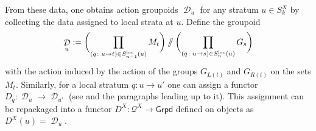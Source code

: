 \documentclass[pdftex]{sigma}
\DeclareMathOperator{\cald}{\mathcal{D}}
\newcommand{\sslash}{\mathbin{/\mkern-6mu/}}
\numberwithin{equation}{section}
\theoremstyle{definition}
\begin{document}
From these data, one obtains action groupoids $\cald_u$ for any stratum $u \in S_k^X$ by collecting the data assigned to local strata at $u$. Define the groupoid
\begin{align*}
 \cald_u := \biggl(\prod_{(q\colon u \rightarrow t) \in S_{n-1}^{\mathrm{loc}}(u)} M_t \biggr) \sslash \biggl( \prod_{(q\colon u \rightarrow s) \in S_n^{\mathrm{loc}}(u)} G_s \biggr)
\end{align*}
with the action induced by the action of the groups $G_{L(t)}$ and $G_{R(t)}$ on the sets $M_t$. Similarly, for a local stratum $q\colon u \rightarrow u'$ one can assign a functor $D_q\colon \cald_u \rightarrow \cald_{u'}$ (see \cite[Lemma 4.3]{FMM} and the paragraphs leading up to it). This assignment can be repackaged into a functor $D^X\colon \mathcal{Q}^X \rightarrow \mathsf{Grpd}$ defined on objects as $D^X(u) = \cald_u$.
\end{document}
